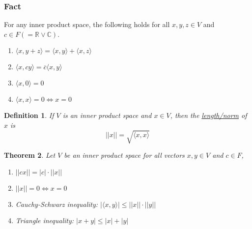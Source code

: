 \documentclass{article}
\newtheorem{theorem}{Theorem}[section]
\newtheorem{definition}[theorem]{Definition}
\newtheorem{one minute paper}[theorem]{One Minute Paper}
\begin{document}
\subsubsection*{Fact}

For any inner product space, the following holds for all $x,y,z \in V$ and $c \in F(=\mathbb{R} \lor \mathbb{C})$. 
\begin{enumerate}
    \item $\langle x, y + z \rangle = \langle x, y \rangle + \langle x, z \rangle$
    \item $\langle x, cy \rangle = \overline{c}\langle x,y \rangle$
    \item $\langle x, 0 \rangle = 0$
    \item $\langle x,x \rangle = 0 \iff x = 0$
\end{enumerate}

\begin{definition}
    If $V$ is an inner product space and $x \in V$, then the \underline{length/norm} of $x$ is 
    \begin{equation}
        ||x|| = \sqrt{\langle x, x \rangle}
    \end{equation} 
\end{definition}

\begin{theorem}
    Let $V$ be an inner product space for all vectors $x,y \in V$ and $c \in F$, 
    \begin{enumerate}
        \item $||cx|| = |c| \cdot ||x||$
        \item $||x|| = 0 \iff x = 0$
        \item Cauchy-Schwarz inequality: $|\langle x,y \rangle| \leq ||x|| \cdot ||y||$
        \item Triangle inequality: $|x+y| \leq |x| + |y|$
    \end{enumerate}
\end{theorem}
\end{document}
